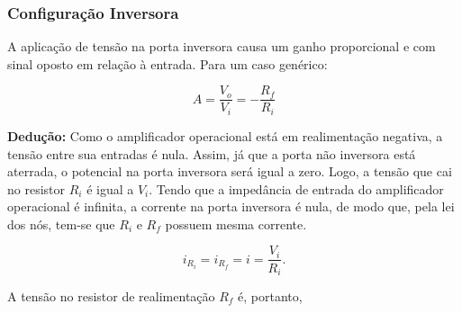 \documentclass{article}
\numberwithin{equation}{section}
\newcommand{\curtovirtual}{($(opamp.+)+(0.3,0)$) to[open,v^=$ $, l=0, voltage shift=1] ($(opamp.-)+(0.3,0)$)}
\begin{document}
\subsubsection{Configuração Inversora}
A aplicação de tensão na porta inversora causa um ganho proporcional e com sinal oposto em relação à entrada. Para um caso genérico:

\begin{center}
\end{center}

\begin{equation}
    A=\frac{V_{o}}{V_{i}}=-\frac{R_{f}}{R_{i}}  \label{eq:ampop_inversor}
\end{equation}

\textbf{Dedução:} Como o amplificador operacional está em realimentação negativa, a tensão entre sua entradas é nula. Assim, já que a porta não inversora está aterrada, o potencial na porta inversora será igual a zero. Logo, a tensão que cai no resistor $R_i$ é igual a $V_i$. Tendo que a impedância de entrada do amplificador operacional é infinita, a corrente na porta inversora é nula, de modo que, pela lei dos nós, tem-se que $R_i$ e $R_f$ possuem mesma corrente.

\begin{center}
\end{center}

\begin{equation*}
    i_{R_i} = i_{R_f} = i = \dfrac{V_i}{R_i}.
\end{equation*}

\noindent A tensão no resistor de realimentação $R_f$ é, portanto,
\end{document}
